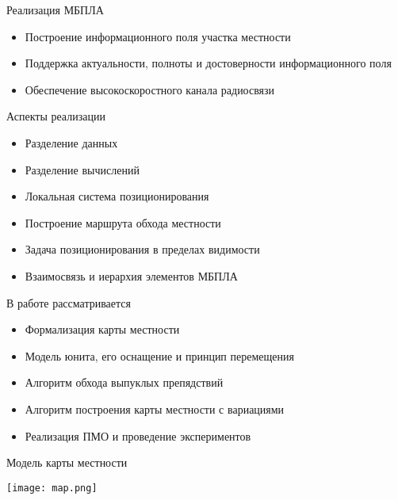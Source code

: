 \begin{tslide}{Реализация МБПЛА}
\begin{itemize}
\item Построение информационного поля участка местности
\item Поддержка актуальности, полноты и достоверности информационного поля
\item Обеспечение высокоскоростного канала радиосвязи
\end{itemize}
\end{tslide}

\begin{tslide}{Аспекты реализации}
\begin{itemize}
\item Разделение данных
\item Разделение вычислений
\item Локальная система позиционирования
\item Построение маршрута обхода местности
\item Задача позиционирования в пределах видимости
\item Взаимосвязь и иерархия элементов МБПЛА
\end{itemize}
\end{tslide}

\begin{tslide}{В работе рассматривается}

\begin{itemize}
\item Формализация карты местности
\item Модель юнита, его оснащение и принцип перемещения
\item Алгоритм обхода выпуклых препядствий
\item Алгоритм построения карты местности
    с вариациями
\item Реализация ПМО и проведение экспериментов
\end{itemize}

\end{tslide}

\begin{tslide}{Модель карты местности}

    \texttt{[image: map.png]}

\end{tslide}

